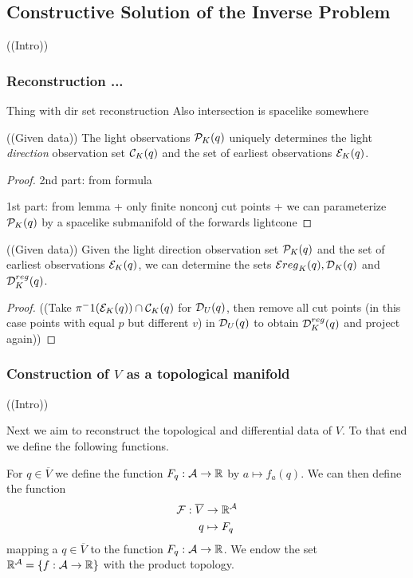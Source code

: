 \subsection{Constructive Solution of the Inverse Problem}
 
((Intro))

\subsubsection{Reconstruction ...}


\begin{lemma}
Thing with dir set reconstruction
Also intersection is spacelike somewhere
\end{lemma}

\begin{proposition}
((Given data))
The light observations $\mathcal{P}_K(q)$ uniquely determines the light \emph{direction} observation set $\mathcal{C}_K(q)$ and the set of earliest observations $\mathcal{E}_K(q)$.
\end{proposition}
\begin{proof}
2nd part: from formula

1st part: from lemma + only finite nonconj cut points + we can parameterize $\mathcal{P}_K(q)$ by a spacelike submanifold of the forwards lightcone
\end{proof}

\begin{proposition}
((Given data))
Given the light direction observation set $\mathcal{P}_K(q)$ and the set of earliest observations $\mathcal{E}_K(q)$, we can determine the sets $\mathcal{E}{reg}_K(q), \mathcal{D}_K(q)$ and $\mathcal{D}^{reg}_K(q)$.
\end{proposition}
\begin{proof}
((Take $\pi^-1(\mathcal{E}_K(q))\cap \mathcal{C}_K(q)$ for $\mathcal{D}_U(q)$, then remove all cut points (in this case points with equal $p$ but different $v$) in $\mathcal{D}_U(q)$ to obtain $\mathcal{D}^{reg}_K(q)$ and project again))
\end{proof}

\subsubsection{Construction of $V$ as a topological manifold}
((Intro))

Next we aim to reconstruct the topological and differential data of $V$. To that end we define the following functions.

For $q\in \overline{V}$ we define the function $F_q:\mathcal{A}\to\mathbb{R}$ by $a\mapsto f_a(q)$. We can then define the function 
\begin{align*}
    \mathcal{F}:\overline{V} &\to \mathbb{R}^\mathcal{A}\\
    q&\mapsto F_q
\end{align*} mapping a $q\in \overline{V}$ to the function $F_q:\mathcal{A}\to\mathbb{R}$. We endow the set $\mathbb{R}^\mathcal{A} = \{f:\mathcal{A}\to \mathbb{R}\}$ with the product topology.

